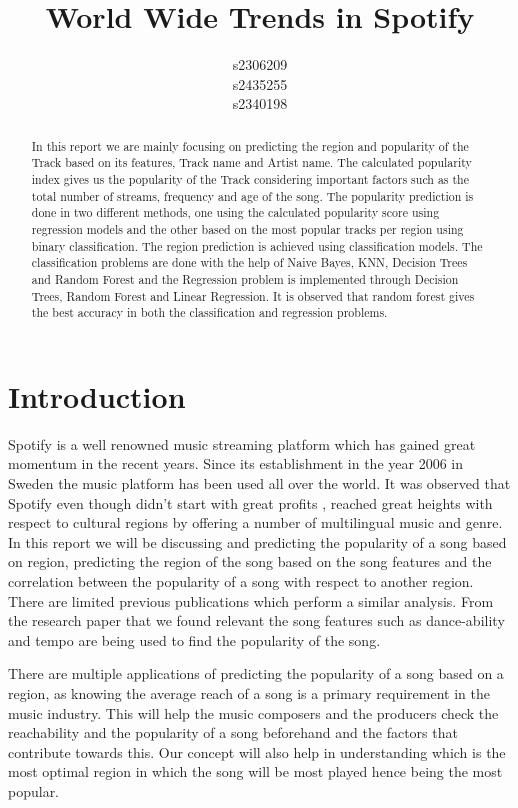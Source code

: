 \documentclass{article}
\title{World Wide Trends in Spotify}
\author{
  s2306209\\
  \And
  s2435255\\
 \And
  s2340198\\
}
\begin{document}
\maketitle

\begin{abstract}
 In this report we are mainly focusing on predicting the region and popularity of the Track based on its features, Track name and Artist name. The calculated popularity index gives us the popularity of the Track considering important factors such as the total number of streams, frequency and age of the song. The popularity prediction is done in two different methods, one using the calculated popularity score using regression models and the other based on the most popular tracks per region using binary classification. The region prediction is achieved using classification models. The classification problems are done with the help of Naive Bayes, KNN, Decision Trees and Random Forest and the Regression problem is implemented through Decision Trees, Random Forest and Linear Regression. It is observed that random forest gives the best accuracy in both the classification and regression problems.   
\end{abstract}

\section{Introduction}

Spotify is a well renowned music streaming platform which has gained great momentum in the recent years. Since its establishment in the year 2006 in Sweden the music platform has been used all over the world. It was observed that Spotify even though didn't start with great profits \cite{setty2013hidden}, reached great heights with respect to cultural regions by offering a number of multilingual music and genre. In this report we will be discussing and predicting the popularity of a song based on region, predicting the region of the song based on the song features and the correlation between the popularity of a song with respect to another region. There are limited previous publications which perform a similar analysis. From the research paper that we found relevant \cite{9776765} the song features such as dance-ability and tempo are being used to find the popularity of the song.

There are multiple applications of predicting the popularity of a song based on a region, as knowing the average reach of a song is a primary requirement in the music industry. This will help the music composers and the producers check the reachability and the popularity of a song beforehand and the factors that contribute towards this. Our concept will also help in understanding which is the most optimal region in which the song will be most played hence being the most popular.
\end{document}
